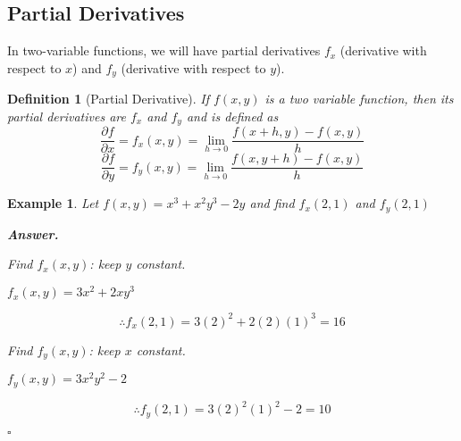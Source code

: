 \documentclass[12pt,a4paper]{article}
\newtheorem{df}{Definition}[subsection]
\newtheorem{eg}{Example}[subsection]
\newenvironment*{ans}{\par\indent\textbf{\textit{Answer. }}\par}{\par\hfill{$\square$}\par}
\def\dsst{\displaystyle}
\def\del{\partial}
\def\pdfdx{\dsst\frac{\del f}{\del x}}
\def\pdfdy{\dsst\frac{\del f}{\del y}}
\begin{document}
\subsection{Partial Derivatives}
In two-variable functions, we will have partial derivatives $f_x$ (derivative with respect to $x$) and $f_y$ (derivative with respect to $y$).
\begin{df}[Partial Derivative]
	If $f(x,y)$ is a two variable function, then its partial derivatives are $f_x$ and $f_y$ and is defined as \[\pdfdx=f_x(x,y)=\lim_{h\to0}\frac{f(x+h,y)-f(x,y)}{h}\]\[\pdfdy=f_y(x,y)=\lim_{h\to0}\frac{f(x,y+h)-f(x,y)}{h}\]	
\end{df}
\begin{eg}
	Let $f(x,y)=x^3+x^2y^3-2y$ and find $f_x(2,1)$ and $f_y(2,1)$
	\begin{ans}
		Find $f_x(x,y)$: keep $y$ constant.\par $f_x(x,y)=3x^2+2xy^3$\par \[\therefore f_x(2,1)=3(2)^2+2(2)(1)^3=16\]\par Find $f_y(x,y)$: keep $x$ constant.\par $f_y(x,y)=3x^2y^2-2$\par\[\therefore f_y(2,1)=3(2)^2(1)^2-2=10\]
	\end{ans}
\end{eg}
\end{document}
